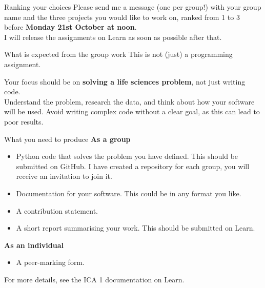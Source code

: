 \documentclass[9pt, aspectratio=169]{beamer}
\begin{document}
\begin{frame}
    {Ranking your choices}
    \Large
    \centering
    Please send me a message (one per group!) with your group name and the three projects you would like to work on, ranked from 1 to 3\\before \textbf{Monday 21st October at noon}.\\
    \vspace{1em}
    I will release the assignments on Learn as soon as possible after that.
\end{frame}

\begin{frame}
    {What is expected from the group work}
    This is not (just) a programming assignment.

    Your focus should be on \textbf{solving a life sciences problem}, not just writing code.\\
    Understand the problem, research the data, and think about how your software will be used. Avoid writing complex code without a clear goal, as this can lead to poor results.
\end{frame}

\begin{frame}
    {What you need to produce}
    \textbf{As a group}
    \begin{itemize}
        \item Python code that solves the problem you have defined. This should be submitted on GitHub. I have created a repository for each group, you will receive an invitation to join it.
        \item Documentation for your software. This could be in any format you like.
        \item A contribution statement.
        \item A short report summarising your work. This should be submitted on Learn.
    \end{itemize}

    \pause

    \textbf{As an individual}
    \begin{itemize}
        \item A peer-marking form.
    \end{itemize}

    For more details, see the ICA 1 documentation on Learn.
\end{frame}
\end{document}

